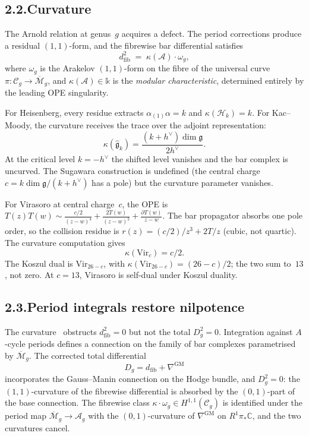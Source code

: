 \documentclass[11pt,reqno]{amsart}
\makeatletter
\theoremstyle{definition}
\theoremstyle{remark}
\providecommand{\cA}{\mathcal{A}}
\providecommand{\Bbbk}{\mathbb{k}}
\numberwithin{equation}{section}
\let\svy@oldeqref\eqref
\renewcommand{\eqref}[1]{%
 \@ifundefined{r@#1}{(\textit{full monograph})}{\svy@oldeqref{#1}}%
}
\makeatother
\begin{document}
\subsection*{2.2.\enspace Curvature}

The Arnold relation at genus~$g$ acquires a defect. The period
corrections produce a residual $(1,1)$-form, and the fibrewise bar
differential satisfies
\begin{equation}\label{eq:pref-curvature}
d_{\mathrm{fib}}^{2}\;=\;\kappa(\cA)\cdot\omega_g,
\end{equation}
where $\omega_g$ is the Arakelov $(1,1)$-form on the fibre of the
universal curve $\pi\colon\mathcal C_g\to\overline{\mathcal M}_g$, and
$\kappa(\cA)\in\Bbbk$ is the \emph{modular characteristic}, determined
entirely by the leading OPE singularity.

For Heisenberg, every residue extracts $\alpha_{(1)}\alpha=k$ and
$\kappa(\mathcal H_k)=k$. For Kac--Moody, the curvature receives the
trace over the adjoint representation:
\[
\kappa(\widehat{\mathfrak g}_k)=\frac{(k+h^\vee)\dim\mathfrak g}{2h^\vee}.
\]
At the critical level $k=-h^\vee$ the shifted level vanishes and the
bar complex is uncurved. The Sugawara construction is undefined (the
central charge $c=k\dim\mathfrak g/(k+h^\vee)$ has a pole) but the
curvature parameter vanishes.

For Virasoro at central charge~$c$, the OPE is
$T(z)T(w)\sim\tfrac{c/2}{(z-w)^4}+\tfrac{2T(w)}{(z-w)^2}+\tfrac{\partial T(w)}{z-w}$.
The bar propagator absorbs one pole order, so the collision
residue is $r(z)=(c/2)/z^3+2T/z$ (cubic, not quartic).
The curvature computation gives
\[
\kappa(\mathrm{Vir}_c)=c/2.
\]
The Koszul dual is $\mathrm{Vir}_{26-c}$, with
$\kappa(\mathrm{Vir}_{26-c})=(26-c)/2$; the two sum to~$13$, not zero.
At $c=13$, Virasoro is self-dual under Koszul duality.

\subsection*{2.3.\enspace Period integrals restore nilpotence}

The curvature~\eqref{eq:pref-curvature} obstructs $d_{\mathrm{fib}}^2=0$
but not the total $D_g^2=0$. Integration against $A$-cycle periods
defines a connection on the family of bar complexes parametrised by
$\overline{\mathcal M}_g$. The corrected total differential
\[
D_g=d_{\mathrm{fib}}+\nabla^{\mathrm{GM}}
\]
incorporates the Gauss--Manin connection on the Hodge bundle, and
$D_g^2=0$: the $(1,1)$-curvature of the fibrewise differential is
absorbed by the $(0,1)$-part of the base connection. The fibrewise
class $\kappa\cdot\omega_g\in H^{1,1}(\mathcal C_g)$ is identified
under the period map $\overline{\mathcal M}_g\to\mathcal A_g$ with
the $(0,1)$-curvature of $\nabla^{\mathrm{GM}}$ on $R^1\pi_*\mathbb C$,
and the two curvatures cancel.
\end{document}
